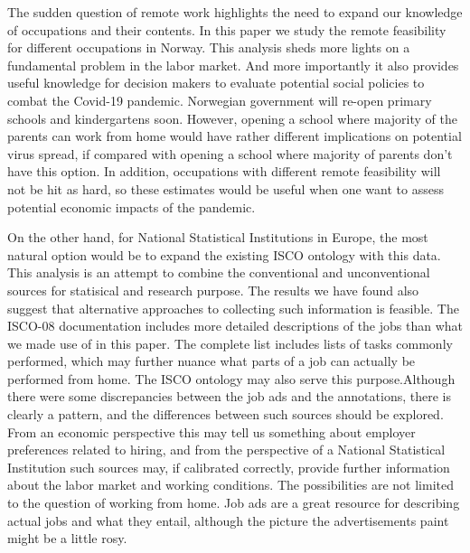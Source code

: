 \documentclass[11pt,]{article}
\begin{document}
The sudden question of remote work highlights the need to expand our
knowledge of occupations and their contents. In this paper we study the
remote feasibility for different occupations in Norway. This analysis
sheds more lights on a fundamental problem in the labor market. And more
importantly it also provides useful knowledge for decision makers to
evaluate potential social policies to combat the Covid-19 pandemic.
Norwegian government will re-open primary schools and kindergartens
soon. However, opening a school where majority of the parents can work
from home would have rather different implications on potential virus
spread, if compared with opening a school where majority of parents
don't have this option. In addition, occupations with different remote
feasibility will not be hit as hard, so these estimates would be useful
when one want to assess potential economic impacts of the pandemic.

On the other hand, for National Statistical Institutions in Europe, the
most natural option would be to expand the existing ISCO ontology with
this data. This analysis is an attempt to combine the conventional and
unconventional sources for statisical and research purpose. The results
we have found also suggest that alternative approaches to collecting
such information is feasible. The ISCO-08 documentation includes more
detailed descriptions of the jobs than what we made use of in this
paper. The complete list includes lists of tasks commonly performed,
which may further nuance what parts of a job can actually be performed
from home. The ISCO ontology may also serve this purpose.Although there
were some discrepancies between the job ads and the annotations, there
is clearly a pattern, and the differences between such sources should be
explored. From an economic perspective this may tell us something about
employer preferences related to hiring, and from the perspective of a
National Statistical Institution such sources may, if calibrated
correctly, provide further information about the labor market and
working conditions. The possibilities are not limited to the question of
working from home. Job ads are a great resource for describing actual
jobs and what they entail, although the picture the advertisements paint
might be a little rosy.


\end{document}
